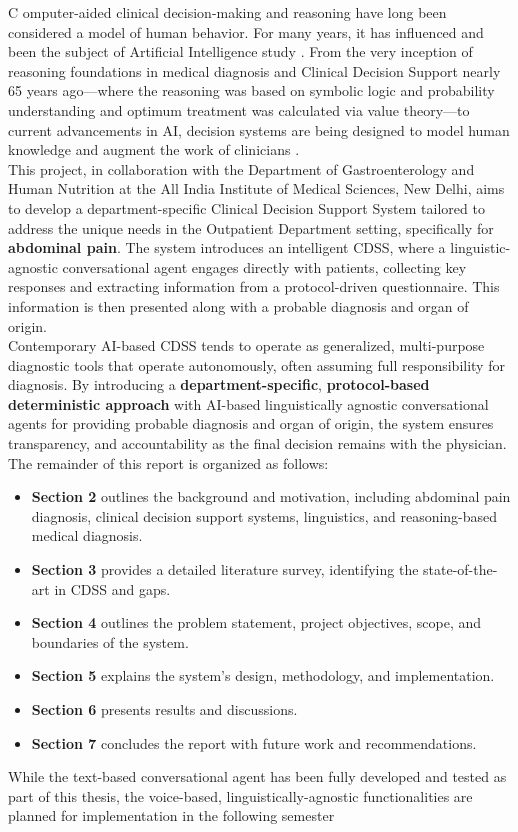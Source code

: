 \lettrine{C}{ }omputer-aided clinical decision-making and reasoning have long been considered a model of human behavior. For many years, it has influenced and been the subject of Artificial Intelligence study \cite{cohen2022introducing}. From the very inception of reasoning foundations in medical diagnosis and Clinical Decision Support nearly 65 years ago---where the reasoning was based on symbolic logic and probability understanding and optimum treatment was calculated via value theory---to current advancements in AI, decision systems are being designed to model human knowledge and augment the work of clinicians \cite{ledley1959reasoning, rajkomar2019machine}.\\

\noindent This project, in collaboration with the Department of Gastroenterology and Human Nutrition at the All India Institute of Medical Sciences, New Delhi, aims to develop a department-specific Clinical Decision Support System tailored to address the unique needs in the Outpatient Department setting, specifically for \textcolor{TUMRed}{\textbf{abdominal pain}}. The system introduces an intelligent CDSS, where a linguistic-agnostic conversational agent engages directly with patients, collecting key responses and extracting information from a protocol-driven questionnaire. This information is then presented along with a probable diagnosis and organ of origin.\\

\noindent Contemporary AI-based CDSS tends to operate as generalized, multi-purpose diagnostic tools that operate autonomously, often assuming full responsibility for diagnosis. By introducing a \textcolor{TUMRed}{\textbf{department-specific}}, \textcolor{TUMRed}{\textbf{protocol-based deterministic approach}} with AI-based linguistically agnostic conversational agents for providing probable diagnosis and organ of origin, the system ensures transparency, and accountability as the final decision remains with the physician.\\

\noindent The remainder of this report is organized as follows:
\begin{itemize}
    \item \textcolor{TUMRed}{\textbf{Section 2}} outlines the background and motivation, including abdominal pain diagnosis, clinical decision support systems, linguistics, and reasoning-based medical diagnosis.
    \item \textcolor{TUMRed}{\textbf{Section 3}} provides a detailed literature survey, identifying the state-of-the-art in CDSS and gaps.
    \item \textcolor{TUMRed}{\textbf{Section 4}} outlines the problem statement, project objectives, scope, and boundaries of the system.
    \item \textcolor{TUMRed}{\textbf{Section 5}} explains the system's design, methodology, and implementation.
    \item \textcolor{TUMRed}{\textbf{Section 6}} presents results and discussions.
    \item \textcolor{TUMRed}{\textbf{Section 7}} concludes the report with future work and recommendations.
\end{itemize}

\noindent While the text-based conversational agent has been fully developed and tested as part of this thesis, the voice-based, linguistically-agnostic functionalities are planned for implementation in the following semester